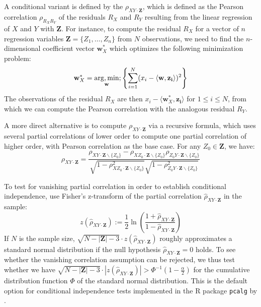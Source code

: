 A conditional variant is defined by the \textit{} $\rho_{XY\cdot \mathbf{Z}}$, which is defined as the Pearson correlation $\rho_{R_XR_Y}$ of the residuals $R_X$ and $R_Y$ resulting from the linear regression of $X$ and $Y$ with $\mathbf{Z}$. For instance, to compute the residual $R_X$ for a vector of $n$ regression variables $\mathbf{Z} = \{Z_1,\dots,Z_n\}$ from $N$ observations, we need to find the $n$-dimensional coefficient vector $\mathbf{w}^{*}_X$ which optimizes the following minimization problem:
\begin{equation}
 \mathbf{w}^{*}_X = \underset{\mathbf{w}}{\operatorname{arg},\operatorname{min}}; \left\{\sum_{i=1}^N (x_i - \langle \mathbf{w}, \mathbf{z_i} \rangle)^2 \right\}
\end{equation}
The observations of the residual $R_X$ are then $x_i - \langle \mathbf{w}^{*}_X, \mathbf{z_i} \rangle$ for $1 \leq i \leq N$,
from which we can compute the Pearson correlation with the analogous residual $R_Y$.

A more direct alternative is to compute $\rho_{XY\cdot \mathbf{Z}}$ via a recursive formula, which uses several partial correlations of lower order to compute one partial correlation of higher order, with Pearson correlation as the base case. For any $Z_0 \in \mathbf{Z}$, we have:
\begin{equation}
 \rho_{XY\cdot \mathbf{Z}} = 
 \frac{\rho_{XY\cdot \mathbf{Z}\backslash\{Z_0\}} - \rho_{XZ_0\cdot \mathbf{Z}\backslash\{Z_0\}} \rho_{Z_0Y\cdot \mathbf{Z}\backslash\{Z_0\}}}
      {\sqrt{1-\rho^2_{XZ_0\cdot \mathbf{Z}\backslash\{Z_0\}}} \sqrt{1-\rho^2_{Z_0Y\cdot \mathbf{Z}\backslash\{Z_0\}}}}
\end{equation}

To test for vanishing partial correlation in order to establish conditional independence,
\citet[5.5]{spirtes_ea_2000} use Fisher's z-transform of the partial correlation $\hat{\rho}_{XY\cdot \mathbf{Z}}$ in the sample:
\begin{equation}
 z(\hat{\rho}_{XY\cdot \mathbf{Z}}) := \frac{1}{2} \ln\left(\frac{1 + \hat{\rho}_{XY\cdot \mathbf{Z}}}{1 - \hat{\rho}_{XY\cdot \mathbf{Z}}} \right)
\end{equation}
If $N$ is the sample size, $\sqrt{N - |\mathbf{Z}| - 3} \cdot z(\hat{\rho}_{XY\cdot \mathbf{Z}})$ roughly approximates a standard normal distribution if the null hypothesis $\hat{\rho}_{XY\cdot \mathbf{Z}} = 0$ holds. To see whether the vanishing correlation assumption can be rejected, we thus test whether we have $\sqrt{N - |\mathbf{Z}| - 3} \cdot |z(\hat{\rho}_{XY\cdot \mathbf{Z}})| > \Phi^{-1}(1 - \frac{\alpha}{2})$ for the cumulative distribution function $\Phi$ of the standard normal distribution. This is the default option for conditional independence tests implemented in the R package \texttt{pcalg} by \cite{kalisch_ea_2012}.

